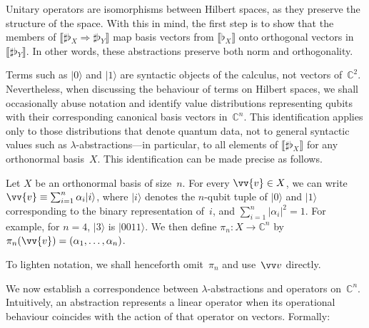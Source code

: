 \documentclass[runningheads,orivec,envcountsame,envcountsect]{llncs}
\providecommand{\qed}{\hbox{\rule{1ex}{1ex}}}%
\newcommand\ket[1]{\ensuremath{|#1\rangle}}
\newcommand\lra{\longrightarrow}
\def\C{\mathbb{C}}            %
\def\Lam#1#2#3{\lambda#1^{#2}{.}#3} %
\def\eval{\lra^*}
\def\Arr{\Rightarrow}
\def\sem#1{\llbracket#1\rrbracket}
\newcommand\basis[1]{\ensuremath{\flat_{#1}}}
\begin{document}
Unitary operators are isomorphisms between Hilbert spaces, as they preserve the
structure of the space. With this in mind, the first step is to show that the
members of $\sem{\sharp\basis{X}\Arr\sharp\basis{Y}}$ map basis vectors from
$\sem{\basis{X}}$ onto orthogonal vectors in $\sem{\sharp\basis{Y}}$. In other
words, these abstractions preserve both norm and orthogonality.


Terms such as $\ket{0}$ and $\ket{1}$ are syntactic objects of the
calculus, not vectors of~$\C^2$. Nevertheless, when discussing the behaviour of
terms on Hilbert spaces, we shall occasionally abuse notation and identify
value distributions representing qubits with their corresponding canonical
basis vectors in~$\C^n$. This identification applies only to those
distributions that denote quantum data, not to general syntactic values such as
$\lambda$-abstractions---in particular, to all elements of
$\sem{\sharp\basis{X}}$ for any orthonormal basis~$X$. This identification can
be made precise as follows.

\begin{definition}
  Let $X$ be an orthonormal basis of size~$n$. For every $\vv{v}\in X$, we can
  write
  \(
    \vv{v}\equiv \sum_{i=1}^{n}\alpha_i\ket{i}
  \),
  where $\ket{i}$ denotes the $n$-qubit tuple of $\ket{0}$ and $\ket{1}$
  corresponding to the binary representation of~$i$, and
  $\sum_{i=1}^{n}|\alpha_i|^2=1$. For example, for $n=4$, $\ket{3}$ is
  $\ket{0011}$. We then define $\pi_n:X\to\C^n$ by
  \(
    \pi_n(\vv{v}) = (\alpha_1,\dotsc,\alpha_n)
  \).
\end{definition}

To lighten notation, we shall henceforth omit~$\pi_n$ and use~$\vv v$
directly.

We now establish a correspondence between $\lambda$-abstractions and operators
on~$\C^n$. Intuitively, an abstraction represents a linear operator when its
operational behaviour coincides with the action of that operator on vectors.
Formally:
\end{document}
